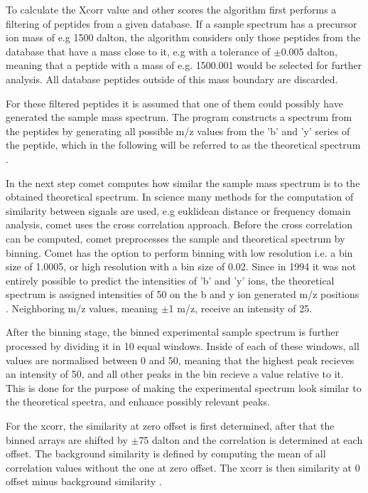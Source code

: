 \documentclass[11pt]{article}
\begin{document}
To calculate the Xcorr value and other scores the algorithm first performs a filtering of peptides from a given database. If a sample spectrum has a precursor ion mass of e.g 1500 dalton, the algorithm considers only those peptides from the database that have a mass close to it, e.g with a tolerance of  $\pm$0.005 dalton, meaning that a peptide with a mass of e.g. 1500.001 would be selected for further analysis. All database peptides outside of this mass boundary are discarded.

For these filtered peptides it is assumed that one of them could possibly have generated the sample mass spectrum. The program constructs a spectrum from the peptides by generating all possible m/z values from the 'b' and 'y' series of the peptide, which in the following will be referred to as the theoretical spectrum \cite{comet-first-paper}. 

In the next step comet computes how similar the sample mass spectrum is to the obtained theoretical spectrum. In science many methods for the computation of similarity between signals are used, e.g euklidean distance or frequency domain analysis, comet uses the cross correlation approach. Before the cross correlation can be computed, comet preprocesses the sample and theoretical spectrum by binning. Comet has the option to perform binning with low resolution i.e. a bin size of 1.0005, or high resolution with a bin size of 0.02. Since in 1994 it was not entirely possible to predict the intensities of 'b' and 'y' ions, the theoretical spectrum is assigned intensities of 50 on the b and y ion generated m/z positions \cite{deeper-look-into-comet}. Neighboring m/z values, meaning $\pm$1 m/z, receive an intensity of 25. 

After the binning stage, the binned experimental sample spectrum is further processed by dividing it in 10 equal windows. Inside of each of these windows, all values are normalised between 0 and 50, meaning that the highest peak recieves an intensity of 50, and all other peaks in the bin recieve a value relative to it. This is done for the purpose of making the experimental spectrum look similar to the theoretical spectra, and enhance possibly relevant peaks.

For the xcorr, the similarity at zero offset is first determined, after that the binned arrays are shifted by $\pm$75 dalton and the correlation is determined at each offset. The background similarity is defined by computing the mean of all correlation values without the one at zero offset. The xcorr is then similarity at 0 offset minus background similarity \cite{xcorr-function}.
\end{document}
